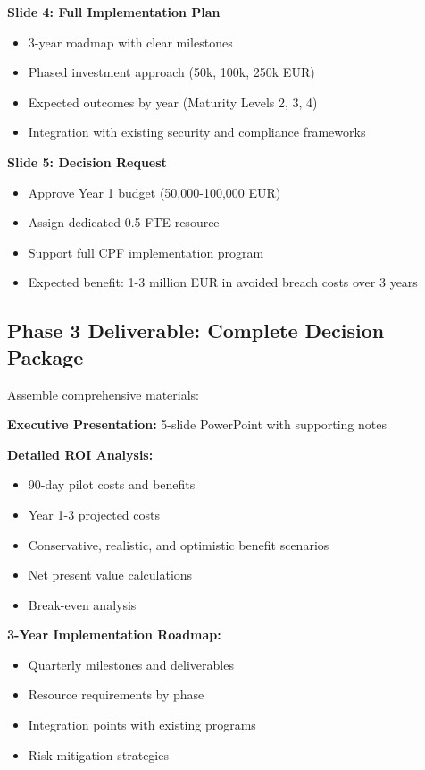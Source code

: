 \documentclass[11pt,a4paper]{article}
\begin{document}
\textbf{Slide 4: Full Implementation Plan}
\begin{itemize}
\item 3-year roadmap with clear milestones
\item Phased investment approach (50k, 100k, 250k EUR)
\item Expected outcomes by year (Maturity Levels 2, 3, 4)
\item Integration with existing security and compliance frameworks
\end{itemize}

\textbf{Slide 5: Decision Request}
\begin{itemize}
\item Approve Year 1 budget (50,000-100,000 EUR)
\item Assign dedicated 0.5 FTE resource
\item Support full CPF implementation program
\item Expected benefit: 1-3 million EUR in avoided breach costs over 3 years
\end{itemize}

\subsection{Phase 3 Deliverable: Complete Decision Package}

Assemble comprehensive materials:

\textbf{Executive Presentation:} 5-slide PowerPoint with supporting notes

\textbf{Detailed ROI Analysis:}
\begin{itemize}
\item 90-day pilot costs and benefits
\item Year 1-3 projected costs
\item Conservative, realistic, and optimistic benefit scenarios
\item Net present value calculations
\item Break-even analysis
\end{itemize}

\textbf{3-Year Implementation Roadmap:}
\begin{itemize}
\item Quarterly milestones and deliverables
\item Resource requirements by phase
\item Integration points with existing programs
\item Risk mitigation strategies
\end{itemize}
\end{document}
